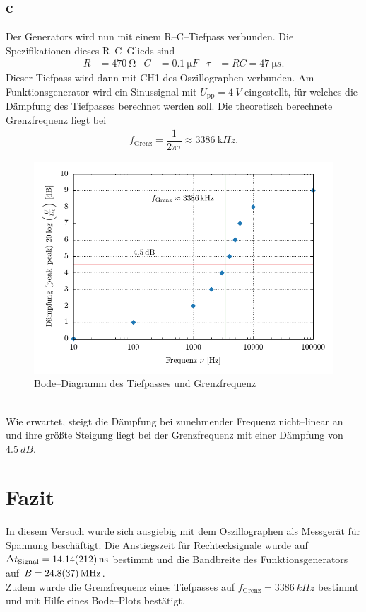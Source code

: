 \documentclass[a4paper,10pt]{article}
\numberwithin{equation}{section}
\begin{document}
\subsection{c}
Der Generators wird nun mit einem R--C--Tiefpass verbunden.
Die Spezifikationen dieses R--C--Glieds sind
\begin{align} 
        R &= \SI{470}{\ohm} & C &= \SI{0.1}{\micro F} & \tau &= RC = \SI{47}{\micro s}
.\end{align} 
Dieser Tiefpass wird dann mit CH1 des Oszillographen verbunden.
Am Funktionsgenerator wird ein Sinussignal mit $U_\text{pp}=\SI{4}{V}$ eingestellt, für welches die Dämpfung des Tiefpasses berechnet werden soll. 
Die theoretisch berechnete Grenzfrequenz liegt bei 
\begin{align} 
        f_\text{Grenz}=\dfrac{1}{2\pi \tau }\approx \SI{3386}{\kilo Hz}
.\end{align} 
\begin{figure}[h]
        \centering
        \includegraphics[width=\textwidth]{plot/c_crop.pdf}
        \caption{Bode--Diagramm des Tiefpasses und Grenzfrequenz}
\end{figure}\\
Wie erwartet, steigt die Dämpfung bei zunehmender Frequenz nicht--linear an und ihre größte Steigung liegt bei der Grenzfrequenz mit einer Dämpfung von $\SI{4.5}{dB}$.

\newpage
\section{Fazit}
In diesem Versuch wurde sich ausgiebig mit dem Oszillographen als Messgerät für Spannung beschäftigt.
Die Anstiegszeit für Rechtecksignale wurde auf $\Delta t_\text{Signal}=\SI{14.14+-2.12}{ns}$ bestimmt und die Bandbreite des Funktionsgenerators auf $B=\SI{24.8+-3.7}{\mega Hz}$.
\\\indent Zudem wurde die Grenzfrequenz eines Tiefpasses auf $f_\text{Grenz}=\SI{3386}{kHz}$ bestimmt und mit Hilfe eines Bode--Plots bestätigt.


\clearpage
\listoffigures
\listoftables




\end{document}
